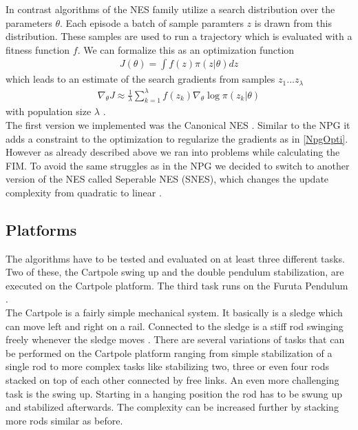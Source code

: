 In contrast algorithms of the NES family utilize a search distribution over the parameters $\theta$. Each episode a batch of sample paramters $z$ is drawn from this distribution. These samples are used to run a trajectory which is evaluated with a fitness function $f$. We can formalize this as an optimization function
\begin{align}
  J(\theta) = \int f(z) \pi(z|\theta) dz
\end{align}
which leads to an estimate of the search gradients from samples $z_1 ... z_{\lambda}$
\begin{align}
  \nabla_{\theta} J \approx \frac{1}{\lambda} \sum_{k=1}^{\lambda} f(z_k) \nabla_{\theta} \log \pi(z_k|\theta)
\end{align}
with population size $\lambda$ \cite{Wierstra14}. \\
The first version we implemented was the Canonical NES \cite{Wierstra14}. Similar to the NPG it adds a constraint to the optimization to regularize the gradients as in  \autoref{NpgOpti}. However as already described above we ran into problems while calculating the FIM. To avoid the same struggles as in the NPG we decided to switch to another version of the NES called Seperable NES (SNES), which changes the update complexity from quadratic to linear \cite{Wierstra14}.

\subsection{Platforms}
\label{plats}
The algorithms have to be tested and evaluated on at least three different tasks. Two of these, the Cartpole swing up and the double pendulum stabilization, are executed on the Cartpole platform. The third task runs on the Furuta Pendulum \cite{Furuta1991}. \\

The Cartpole is a fairly simple mechanical system. It basically is a sledge which can move left and right on a rail. Connected to the sledge is a stiff rod swinging freely whenever the sledge moves \cite{Barto1983}. There are several variations of tasks that can be performed on the Cartpole platform ranging from simple stabilization of a single rod to more complex tasks like stabilizing two, three or even four rods stacked on top of each other connected by free links. An even more challenging task is the swing up. Starting in a hanging position the rod has to be swung up and stabilized afterwards. The complexity can be increased further by stacking more rods similar as before. \\

